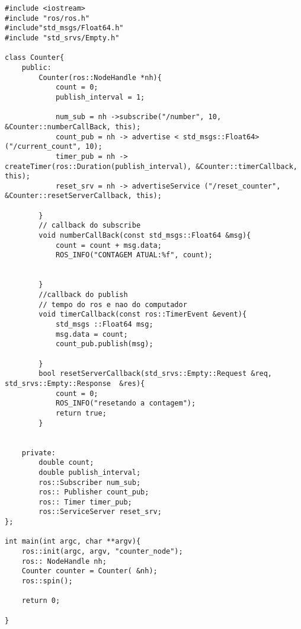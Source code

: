 \documentclass[letterpaper]{article}
\begin{document}
\begin{lstlisting}[style=cppStyle, title=counter.cpp] 
#include <iostream>
#include "ros/ros.h"
#include"std_msgs/Float64.h"
#include "std_srvs/Empty.h"

class Counter{
    public:
        Counter(ros::NodeHandle *nh){
            count = 0;
            publish_interval = 1;

            num_sub = nh ->subscribe("/number", 10, &Counter::numberCallBack, this);
            count_pub = nh -> advertise < std_msgs::Float64>("/current_count", 10);
            timer_pub = nh -> createTimer(ros::Duration(publish_interval), &Counter::timerCallback, this);
            reset_srv = nh -> advertiseService ("/reset_counter",  &Counter::resetServerCallback, this);

        }
        // callback do subscribe
        void numberCallBack(const std_msgs::Float64 &msg){
            count = count + msg.data;
            ROS_INFO("CONTAGEM ATUAL:%f", count); 


        }
        //callback do publish
        // tempo do ros e nao do computador
        void timerCallback(const ros::TimerEvent &event){
            std_msgs ::Float64 msg;
            msg.data = count;
            count_pub.publish(msg); 

        }
        bool resetServerCallback(std_srvs::Empty::Request &req, std_srvs::Empty::Response  &res){
            count = 0;
            ROS_INFO("resetando a contagem");
            return true;
        }


    private:
        double count;
        double publish_interval;
        ros::Subscriber num_sub;
        ros:: Publisher count_pub;
        ros:: Timer timer_pub;
        ros::ServiceServer reset_srv;
};

int main(int argc, char **argv){
    ros::init(argc, argv, "counter_node");
    ros:: NodeHandle nh;
    Counter counter = Counter( &nh);
    ros::spin();

    return 0;

}


\end{lstlisting}
\end{document}
